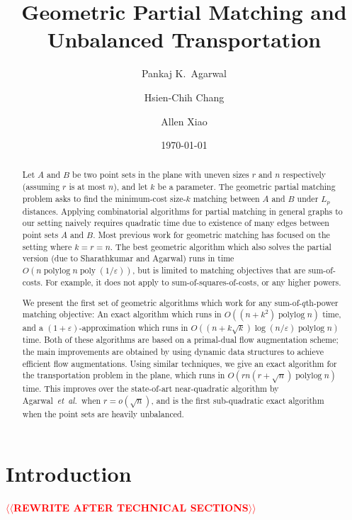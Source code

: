 \documentclass[a4paper,UKenglish]{socg-lipics-v2018}
\title{Geometric Partial Matching and Unbalanced Transportation}
\author{Pankaj K.\ Agarwal}{Duke Univeristy, USA}{pankaj@cs.duke.edu}{}{}
\author{Hsien-Chih Chang}{Duke Univeristy, USA}{hsienchih.chang@duke.edu}{}{}
\author{Allen Xiao}{Duke Univeristy, USA}{axiao@cs.duke.edu}{}{}
\date{\today}
\makeatletter
\def\note#1{\textcolor{red}{{#1}}}
\def\etal{\emph{et~al.}}
\def\etal{\textit{et~al.}}
\def\poly{\mathop{\mathrm{poly}}}
\def\polylog{\mathop{\mathrm{polylog}}}
\def\eps{\varepsilon}
\theoremstyle{plain}
\numberwithin{figure}{section}
\def\n@te#1{\textsf{\boldmath \textbf{$\langle\!\langle$#1$\rangle\!\rangle$}}\leavevmode}
\def\note#1{\textcolor{red}{\n@te{#1}}}
\makeatother
\begin{document}
\maketitle

\begin{abstract}
Let $A$ and $B$ be two point sets in the plane with uneven sizes $r$ and $n$ respectively (assuming $r$ is at most $n$), and let $k$ be a parameter. The geometric partial matching problem asks to find the minimum-cost size-$k$ matching between $A$ and $B$ under $L_p$ distances. Applying combinatorial algorithms for partial matching in general graphs to our setting naively requires quadratic time due to existence of many edges between point sets $A$ and $B$. Most previous work for geometric matching has focused on the setting where $k = r = n$. The best geometric algorithm which also solves the partial version (due to Sharathkumar and Agarwal) runs in time $O(n\polylog n \poly(1/\eps))$, but is limited to matching objectives that are sum-of-costs. For example, it does not apply to sum-of-squares-of-costs, or any higher powers.

We present the first set of geometric algorithms which work for any sum-of-$q$th-power matching objective: An exact algorithm which runs in $O((n + k^2)\polylog n)$ time, and a $(1 + \eps)$-approximation which runs in $O((n + k\sqrt{k})\log(n/\eps)\polylog n)$ time. Both of these algorithms are based on a primal-dual flow augmentation scheme; the main improvements are obtained by using dynamic data structures to achieve efficient flow augmentations.
Using similar techniques, we give an exact algorithm for the transportation problem in the plane, which runs in $O(rn(r + \sqrt{n})\polylog n)$ time. This improves over the state-of-art near-quadratic algorithm by Agarwal~\etal\ when $r = o(\sqrt{n})$, and is the first sub-quadratic exact algorithm when the point sets are heavily unbalanced.
\end{abstract}


\section{Introduction}

\note{REWRITE AFTER TECHNICAL SECTIONS}
\end{document}
